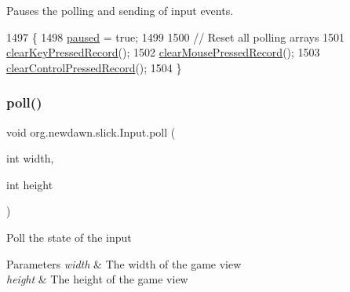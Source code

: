 Pauses the polling and sending of input events. 
\begin{DoxyCode}
1497                         \{
1498         \mbox{\hyperlink{classorg_1_1newdawn_1_1slick_1_1_input_aaf9066433bbf1f7a1fc5738405412a32}{paused}} = \textcolor{keyword}{true};
1499 
1500         \textcolor{comment}{// Reset all polling arrays}
1501         \mbox{\hyperlink{classorg_1_1newdawn_1_1slick_1_1_input_a0c1b796b24304c122ad233e9d70bdc73}{clearKeyPressedRecord}}();
1502         \mbox{\hyperlink{classorg_1_1newdawn_1_1slick_1_1_input_ac93fc5f763ff9031b095ecdaa118c6c3}{clearMousePressedRecord}}();
1503         \mbox{\hyperlink{classorg_1_1newdawn_1_1slick_1_1_input_af2cfc367b630baff82ee280cbc394244}{clearControlPressedRecord}}();
1504     \}
\end{DoxyCode}
\mbox{\label{classorg_1_1newdawn_1_1slick_1_1_input_ab0bd897ff9bebf164e73a42bb560451b}} 
\subsubsection{\texorpdfstring{poll()}{poll()}}
{\footnotesize\ttfamily void org.\+newdawn.\+slick.\+Input.\+poll (\begin{DoxyParamCaption}\item[{int}]{width,  }\item[{int}]{height }\end{DoxyParamCaption})\hspace{0.3cm}{\ttfamily [inline]}}

Poll the state of the input


\begin{DoxyParams}{Parameters}
{\em width} & The width of the game view \\
\hline
{\em height} & The height of the game view \\
\hline
\end{DoxyParams}

